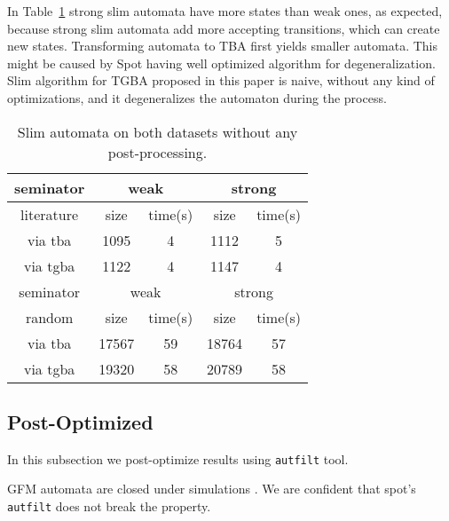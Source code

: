 \documentclass[
	digital,
nolof, nolot
]{fithesis3}
\begin{document}
	In Table~\ref{table:seminator:unoptimized} strong slim automata have more states than weak ones, as expected, because strong slim automata add more accepting transitions, which can create new states. Transforming automata to TBA first yields smaller automata. This might be caused by Spot having well optimized algorithm for degeneralization. Slim algorithm for TGBA proposed in this paper is naive, without any kind of optimizations, and it degeneralizes the automaton during the process.
\begin{table}[ht]
	\label{table:seminator:unoptimized}
	\centering
	\caption{Slim automata on both datasets without any post-processing.}
		\begin{tabular}{ |c||c|c|c|c| } 
			\hline
			seminator&\multicolumn{2}{c|}{weak}&\multicolumn{2}{c|}{strong} \\
			\hline
			literature&size&time(s)&size&time(s)\\
			\hhline{|=====|}
			
			via tba	&	1095	&4	& 1112 	&5\\
			\hline
			via tgba&	1122	&4		&1147	&4\\ 
			\hline
			\hline
			\hline
			seminator&\multicolumn{2}{c|}{weak}&\multicolumn{2}{c|}{strong} \\
			\hhline{|=====|}
			random&size&time(s)&size&time(s)\\
			\hline
			via tba&17567&	59& 18764 &57\\
			\hline
			via tgba&19320&	58& 20789&58\\ 
			\hline
		\end{tabular}
\end{table}

	\subsection{Post-Optimized}
	In this subsection we post-optimize results using \texttt{autfilt} tool.
	
	GFM automata are closed under simulations \cite[Section~3.1]{hlavni}. We are confident that spot's \texttt{autfilt} does not break the property.
	
\end{document}
